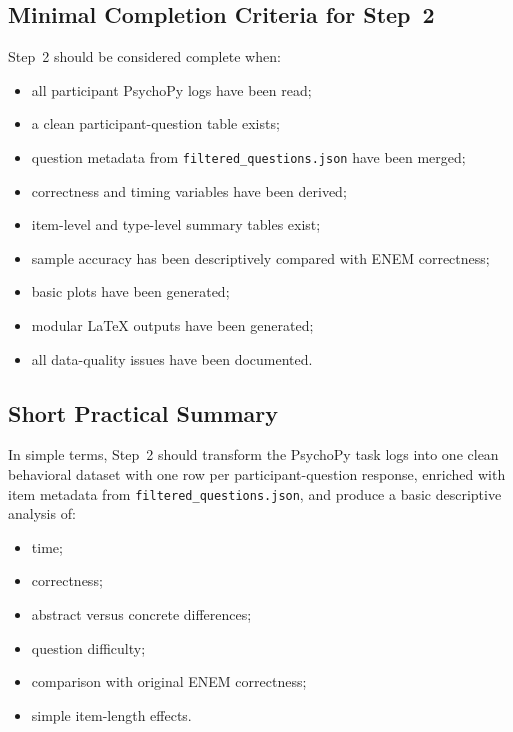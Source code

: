 \documentclass[11pt]{article}
\begin{document}
\subsection{Minimal Completion Criteria for Step~2}
Step~2 should be considered complete when:
\begin{itemize}
    \item all participant PsychoPy logs have been read;
    \item a clean participant-question table exists;
    \item question metadata from \texttt{filtered\_questions.json} have been merged;
    \item correctness and timing variables have been derived;
    \item item-level and type-level summary tables exist;
    \item sample accuracy has been descriptively compared with ENEM correctness;
    \item basic plots have been generated;
    \item modular \LaTeX{} outputs have been generated;
    \item all data-quality issues have been documented.
\end{itemize}

\subsection{Short Practical Summary}
In simple terms, Step~2 should transform the PsychoPy task logs into one clean behavioral dataset with one row per participant-question response, enriched with item metadata from \texttt{filtered\_questions.json}, and produce a basic descriptive analysis of:
\begin{itemize}
    \item time;
    \item correctness;
    \item abstract versus concrete differences;
    \item question difficulty;
    \item comparison with original ENEM correctness;
    \item simple item-length effects.
\end{itemize}
\end{document}
